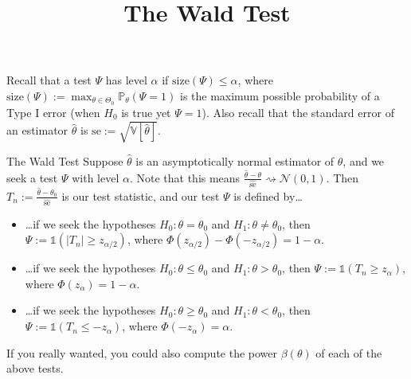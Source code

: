 \title{The Wald Test}



Recall that a test $\Psi$ has level $\alpha$ if
$\mathrm{size}(\Psi) \leq \alpha$, where
$\mathrm{size}(\Psi) := \max_{\theta \in \Theta_0} \mathbb{P}_{\theta}(\Psi = 1)$
is the maximum possible probability of a Type I error
(when $H_0$ is true yet $\Psi = 1$).
Also recall that the standard error of an estimator $\hat{\theta}$
is $\mathrm{se} := \sqrt{\mathbb{V}[\hat{\theta}]}$.

\begin{theorem}{The Wald Test}
    Suppose $\hat{\theta}$ is an asymptotically normal estimator of $\theta$,
    and we seek a test $\Psi$ with level $\alpha$.
    Note that this means $\frac{\hat{\theta} - \theta}{\widehat{\mathrm{se}}}
    \rightsquigarrow \mathcal{N}(0, 1)$. Then
    $T_n := \frac{\hat{\theta} - \theta_0}{\widehat{\mathrm{se}}}$
    is our test statistic, and our test $\Psi$ is defined by\dots
    \begin{itemize}
        \item \dots if we seek the hypotheses $H_0: \theta = \theta_0$
        and $H_1: \theta \neq \theta_0$, then
        $\Psi := \mathds{1}\left(|T_n| \geq z_{\alpha / 2}\right)$, where
        $\Phi(z_{\alpha / 2}) - \Phi(-z_{\alpha / 2}) = 1 - \alpha$.
        \item \dots if we seek the hypotheses $H_0: \theta \leq \theta_0$
        and $H_1: \theta > \theta_0$, then
        $\Psi := \mathds{1}\left(T_n \geq z_{\alpha}\right)$, where
        $\Phi(z_{\alpha}) = 1 - \alpha$.
        \item \dots if we seek the hypotheses $H_0: \theta \geq \theta_0$
        and $H_1: \theta < \theta_0$, then
        $\Psi := \mathds{1}\left(T_n \leq -z_{\alpha}\right)$, where
        $\Phi(-z_{\alpha}) = \alpha$.
    \end{itemize}
\end{theorem}

If you really wanted, you could also compute the power $\beta(\theta)$ of each of the above tests.

